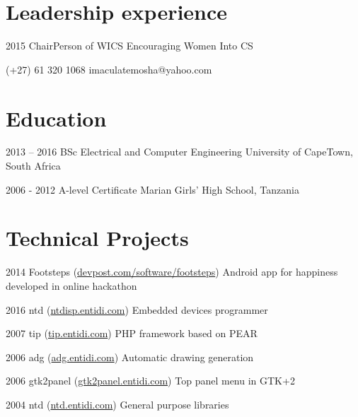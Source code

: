 \documentclass[fontsize=9pt]{tccv}
\begin{document}
\section{Leadership experience}

\begin{yearlist}
{2015}
{ChairPerson of WICS}
{Encouraging Women Into CS}
\end{yearlist}
    {(+27) 61 320 1068}
    {imaculatemosha@yahoo.com}

\section{Education}

\begin{yearlist}

\item{2013 -- 2016}
     {BSc Electrical and Computer Engineering}
     {University of CapeTown, South Africa}

\item{2006 - 2012}
     {A-level Certificate}
     {Marian Girls' High School, Tanzania}

\end{yearlist}

\section{Technical Projects}

\begin{yearlist}

\item{2014}
     {Footsteps (\href{http://devpost.com/software/footsteps}{devpost.com/software/footsteps})}
     {Android app for happiness developed in online hackathon}

\item{2016}
     {ntd (\href{http://ntdisp.entidi.com/}{ntdisp.entidi.com})}
     {Embedded devices programmer}

\item{2007}
     {tip (\href{http://tip.entidi.com/}{tip.entidi.com})}
     {PHP framework based on PEAR}

\item{2006}
     {adg (\href{http://adg.entidi.com/}{adg.entidi.com})}
     {Automatic drawing generation}

\item{2006}
     {gtk2panel (\href{http://gtk2panel.entidi.com/}{gtk2panel.entidi.com})}
     {Top panel menu in GTK+2}

\item{2004}
     {ntd (\href{http://ntd.entidi.com/}{ntd.entidi.com})}
     {General purpose libraries}

\end{yearlist}
\end{document}
